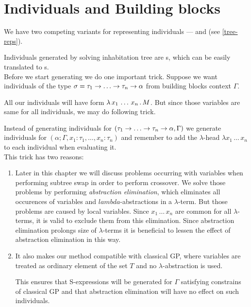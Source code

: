 \documentclass[12pt,a4paper]{report}
\newcommand{\lterm}{$\lambda$-term\xspace}
\newcommand{\lterms}{$\lambda$-terms\xspace}
\newcommand{\lh}[1]{\lambda #1}
\begin{document}
\section{Individuals and Building blocks}

We have two competing variants for representing individuals ---
\textit{\atTree} and \mbox{\textit{\sexprTree}} (see \ref{tree-reps}).

Individuals generated by solving inhabitation tree 
are \sexprTree{}s, which can be easily translated to \atTree{}s. \\


Before we start generating we do one important trick.
Suppose we want individuals of the type 
$\sigma = \tau_1 \ar \dots \ar \tau_n \ar \alpha$
from building blocks context $\Gamma$.

All our individuals will have form $\lambda \, x_1\,\dots\,x_n \, . \, M$.
But since those variables are same for all individuals, 
we may do following trick.

Instead of generating individuals for
$(\tau_1 \ar \dots \ar \tau_n \ar \alpha,\Gamma)$
we generate individuals for $(\alpha;\Gamma,x_1:\tau_1,\dots,x_n:\tau_n)$
and remember to add the $\lambda$-head $\lh{x_1\,\dots\,x_n}$ to
each individual when evaluating it.\\

This trick has two reasons:
\begin{enumerate}
 \item Later in this chapter we will discuss problems occurring with variables
       when performing subtree swap in order to perform crossover.
       We solve those problems by performing \textit{abstraction elimination},
       which eliminates all occurences of variables and $lambda$-abstractions
       in a \lterm. But those problems are caused by local variables. 
       Since $x_1\,\dots\,x_n$ are common for all \lterms, it is valid
       to exclude them from this elimination. Since abstraction elimination
       prolongs size of \lterms it is beneficial to lessen 
       the effect of abstraction elimination in this way. 
        
 \item It also makes our method compatible with classical GP, where
       variables are treated as ordinary element of the set $T$
       and no $\lambda$-abstraction is used.
       
       This ensures that S-expressions will be generated for
       $\Gamma$ satisfying constrains of classical GP and that
       abstraction elimination will have no effect on such individuals.
\end{enumerate}
\end{document}
